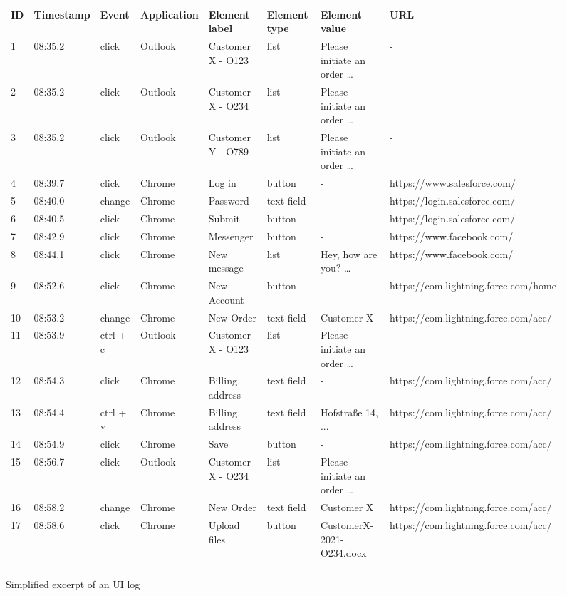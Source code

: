\begin{figure}[h!]
\centering
 \begin{adjustbox}{max width=\textwidth}
\begin{tabular}{llllllll}
\hline\noalign{\smallskip}\noalign{\smallskip}
\textbf{ID} &\textbf{Timestamp}&\textbf{Event}&\textbf{Application}&\textbf{Element label}&\textbf{Element type}&\textbf{Element value}&\textbf{URL}\\
\noalign{\smallskip}\hline\noalign{\smallskip}
1&08:35.2&click&Outlook&Customer X - O123&list&Please initiate an order …&-\\\noalign{\smallskip}
2&08:35.2&click&Outlook&Customer X - O234&list&Please initiate an order …&-\\\noalign{\smallskip}
3&08:35.2&click&Outlook&Customer Y - O789&list&Please initiate an order …&-\\\noalign{\smallskip}
4&08:39.7&click&Chrome&Log in&button&-&https://www.salesforce.com/\\\noalign{\smallskip}
5&08:40.0&change&Chrome&Password&text field&-&https://login.salesforce.com/\\\noalign{\smallskip}
6&08:40.5&click&Chrome&Submit&button&-&https://login.salesforce.com/\\\noalign{\smallskip}
7&08:42.9&click&Chrome&Messenger&button&-&https://www.facebook.com/\\\noalign{\smallskip}
8&08:44.1&click&Chrome&New message&list&Hey, how are you? …&https://www.facebook.com/\\\noalign{\smallskip}
9&08:52.6&click&Chrome&New Account&button&-&https://com.lightning.force.com/home\\\noalign{\smallskip}
10&08:53.2&change&Chrome&New Order&text field&Customer X&https://com.lightning.force.com/acc/\\\noalign{\smallskip}
11&08:53.9&ctrl + c&Outlook &Customer X - O123&list&Please initiate an order …&-\\\noalign{\smallskip}
12&08:54.3&click&Chrome&Billing address&text field&-&https://com.lightning.force.com/acc/\\\noalign{\smallskip}
13&08:54.4&ctrl + v&Chrome&Billing address&text field&Hofstraße 14, ... &https://com.lightning.force.com/acc/\\\noalign{\smallskip}
14&08:54.9&click&Chrome&Save&button&-&https://com.lightning.force.com/acc/\\\noalign{\smallskip}
15&08:56.7&click&Outlook&Customer X - O234&list&Please initiate an order …&-\\\noalign{\smallskip}
16&08:58.2&change&Chrome&New Order&text field&Customer X&https://com.lightning.force.com/acc/\\\noalign{\smallskip}
17&08:58.6&click&Chrome&Upload files&button&CustomerX-2021-O234.docx&https://com.lightning.force.com/acc/\\\noalign{\smallskip}
\hline\noalign{\smallskip}
\end{tabular}
\end{adjustbox}
\caption{Simplified excerpt of an UI log}
\label{fig:example}
\end{figure}

